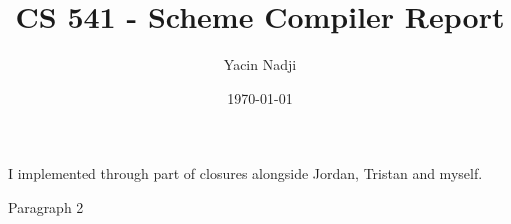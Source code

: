 \documentclass{article}
\title{CS 541 - Scheme Compiler Report}
\author{Yacin Nadji}
\date{\today}
\begin{document}
\maketitle

I implemented through part of closures alongside Jordan, Tristan and myself. 

Paragraph 2
\end{document}
